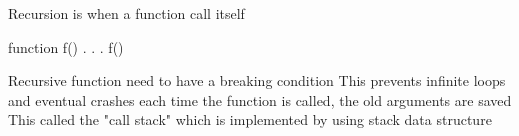 Recursion 
  is when a function call itself

  function f() {
    . . . 
    f()
  }

  Recursive function need to have a breaking condition 
  This prevents infinite loops and eventual crashes 
  each time the function is called, the old arguments are saved 
  This called the "call stack" which is implemented by using stack data structure 


